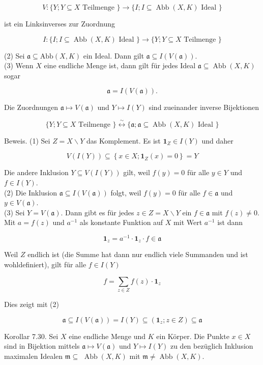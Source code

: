 \documentclass[10pt, letterpaper]{article}
\begin{document}
$$
V:\{Y ; Y \subseteq X \text { Teilmenge }\} \rightarrow\{I ; I \subseteq \operatorname{Abb}(X, K) \text { Ideal }\}
$$

ist ein Linksinverses zur Zuordnung

$$
I:\{I ; I \subseteq \operatorname{Abb}(X, K) \text { Ideal }\} \rightarrow\{Y ; Y \subseteq X \text { Teilmenge }\}
$$

(2) Sei $\mathfrak{a} \subseteq \mathrm{Abb}(X, K)$ ein Ideal. Dann gilt $\mathfrak{a} \subseteq I(V(\mathfrak{a}))$.\\
(3) Wenn $X$ eine endliche Menge ist, dann gilt für jedes Ideal $\mathfrak{a} \subseteq \operatorname{Abb}(X, K)$ sogar

$$
\mathfrak{a}=I(V(\mathfrak{a})) .
$$

Die Zuordnungen $\mathfrak{a} \mapsto V(\mathfrak{a})$ und $Y \mapsto I(Y)$ sind zueinander inverse Bijektionen

$$
\{Y ; Y \subseteq X \text { Teilmenge }\} \stackrel{\sim}{\longleftrightarrow}\{\mathfrak{a} ; \mathfrak{a} \subseteq \operatorname{Abb}(X, K) \text { Ideal }\}
$$

Beweis. (1) Sei $Z=X \backslash Y$ das Komplement. Es ist $\mathbf{1}_{Z} \in I(Y)$ und daher

$$
V(I(Y)) \subseteq\left\{x \in X ; \mathbf{1}_{Z}(x)=0\right\}=Y
$$

Die andere Inklusion $Y \subseteq V(I(Y))$ gilt, weil $f(y)=0$ für alle $y \in Y$ und $f \in I(Y)$.\\
(2) Die Inklusion $\mathfrak{a} \subseteq I(V(\mathfrak{a}))$ folgt, weil $f(y)=0$ für alle $f \in \mathfrak{a}$ und $y \in V(\mathfrak{a})$.\\
(3) Sei $Y=V(\mathfrak{a})$. Dann gibt es für jedes $z \in Z=X \backslash Y$ ein $f \in \mathfrak{a}$ mit $f(z) \neq 0$. Mit $a=f(z)$ und $a^{-1}$ als konstante Funktion auf $X$ mit Wert $a^{-1}$ ist dann

$$
\mathbf{1}_{z}=a^{-1} \cdot \mathbf{1}_{z} \cdot f \in \mathfrak{a}
$$

Weil $Z$ endlich ist (die Summe hat dann nur endlich viele Summanden und ist wohldefiniert), gilt für alle $f \in I(Y)$

$$
f=\sum_{z \in Z} f(z) \cdot \mathbf{1}_{z}
$$

Dies zeigt mit (2)

$$
\mathfrak{a} \subseteq I(V(\mathfrak{a}))=I(Y) \subseteq\left(\mathbf{1}_{z} ; z \in Z\right) \subseteq \mathfrak{a}
$$

Korollar 7.30. Sei $X$ eine endliche Menge und $K$ ein Körper. Die Punkte $x \in X$ sind in Bijektion mittels $\mathfrak{a} \mapsto V(\mathfrak{a})$ und $Y \mapsto I(Y)$ zu den bezüglich Inklusion maximalen Idealen $\mathfrak{m} \subseteq$ $\operatorname{Abb}(X, K)$ mit $\mathfrak{m} \neq \operatorname{Abb}(X, K)$.
\end{document}
